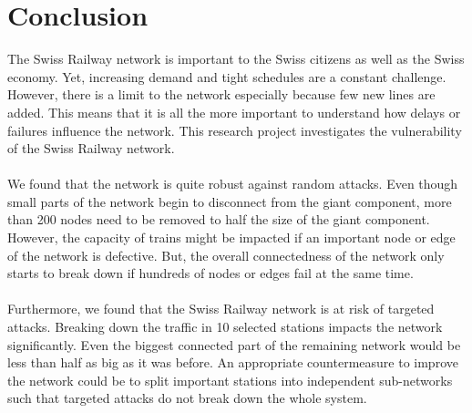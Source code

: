 \documentclass{Resources/netsci-project}
\begin{document}
\section{Conclusion}
The Swiss Railway network is important to the Swiss citizens as well as the Swiss economy. Yet, increasing demand and tight schedules are a constant challenge. However, there is a limit to the network especially because few new lines are added. This means that it is all the more important to understand how delays or failures influence the network. This research project investigates the vulnerability of the Swiss Railway network. 
\\~\\
We found that the network is quite robust against random attacks. Even though small parts of the network begin to disconnect from the giant component, more than 200 nodes need to be removed to half the size of the giant component. However, the capacity of trains might be impacted if an important node or edge of the network is defective. But, the overall connectedness of the network only starts to break down if hundreds of nodes or edges fail at the same time.
\\~\\
Furthermore, we found that the Swiss Railway network is at risk of targeted attacks. Breaking down the traffic in 10 selected stations impacts the network significantly. Even the biggest connected part of the remaining network would be less than half as big as it was before. An appropriate countermeasure to improve the network could be to split important stations into independent sub-networks such that targeted attacks do not break down the whole system. 

\printbibliography
\end{document}
